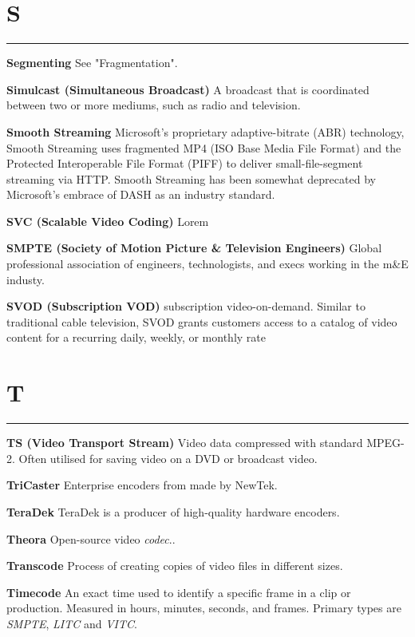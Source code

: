 \section{S}
\hrule

\medskip
\textbf{Segmenting}
See "Fragmentation".

\smallskip
\textbf{Simulcast (Simultaneous Broadcast)}
A broadcast that is coordinated between two or more mediums, such as radio and television.

\smallskip
\textbf{Smooth Streaming}
Microsoft’s proprietary adaptive-bitrate (ABR) technology, Smooth Streaming uses fragmented MP4 (ISO Base Media File Format) and the Protected Interoperable File Format (PIFF) to deliver small-file-segment streaming via HTTP. Smooth Streaming has been somewhat deprecated by Microsoft’s embrace of DASH as an industry standard.

\smallskip
\textbf{SVC (Scalable Video Coding)}
Lorem

\smallskip
\textbf{SMPTE (Society of Motion Picture \& Television Engineers)}
Global professional association of engineers, technologists, and execs working in the m\&E industy.

\smallskip
\textbf{SVOD (Subscription VOD)}
subscription video-on-demand. Similar to traditional cable television, SVOD grants customers access to a catalog of video content for a recurring daily, weekly, or monthly rate


\section{T}
\hrule

\medskip
\textbf{TS (Video Transport Stream)}
Video data compressed with standard MPEG-2. Often utilised for saving video on a DVD or broadcast video.


\smallskip
\textbf{TriCaster}
Enterprise encoders from made by NewTek.

\smallskip
\textbf{TeraDek}
TeraDek is a producer of high-quality hardware encoders.


\smallskip
\textbf{Theora}
Open-source video \textit{codec}..

\smallskip
\textbf{Transcode}
Process of creating copies of video files in different sizes.

\smallskip
\textbf{Timecode}
An exact time used to identify a specific frame in a clip or production. Measured in hours, minutes, seconds, and frames. Primary types are \textit{SMPTE}, \textit{LITC} and \textit{VITC}.

